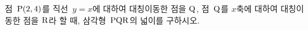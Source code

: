 점~$\mathrm{P}(2{,}\mkern3mu\mathopen{}4)$를 직선~$y=x$에 대하여 대칭이동한 점을 $\mathrm{Q}$, 점~$\mathrm{Q}$를 $x$축에 대하여 대칭이동한 점을 $\mathrm{R}$라 할 때, 삼각형~$\mathrm{PQR}$의 넓이를 구하시오.

